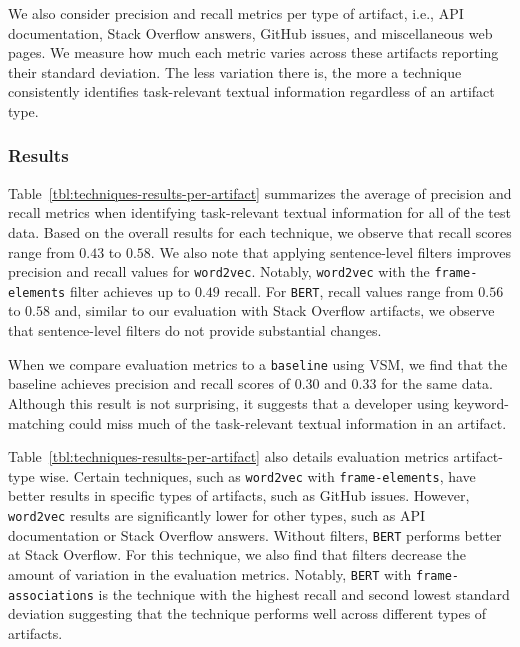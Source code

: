 We also consider precision and recall metrics per type of artifact, i.e., API documentation, Stack Overflow answers, GitHub issues, and miscellaneous web pages.
We measure how much each metric varies across these artifacts reporting their standard deviation.
The less variation there is, the more a technique consistently identifies task-relevant textual information regardless of an artifact type.


\subsubsection{Results}


Table~\ref{tbl:techniques-results-per-artifact} summarizes the average of precision and recall metrics when identifying task-relevant textual information for all of the test data.
Based on the overall results for each technique, we observe that recall scores range from $0.43$ to $0.58$. 
We also note that applying sentence-level filters improves precision and recall values for \texttt{word2vec}. Notably, \texttt{word2vec} with the \texttt{frame-elements} filter achieves up to $0.49$ recall.
For \texttt{BERT}, recall values range from $0.56$ to $0.58$ and, similar to our evaluation with Stack Overflow artifacts,  we observe that sentence-level filters do not provide substantial changes. 



When we compare evaluation metrics to a \texttt{baseline} using VSM, we find that the baseline achieves precision and recall scores of $0.30$ and $0.33$ for the same data. 
Although this result is not surprising, it suggests that a developer using keyword-matching could miss much of the task-relevant textual information in an artifact.


Table~\ref{tbl:techniques-results-per-artifact} also details
evaluation metrics artifact-type wise.
Certain techniques, such as \texttt{word2vec} with \texttt{frame-elements}, have better results in specific 
types of artifacts, such as GitHub issues. However, \texttt{word2vec} results are significantly lower 
for other types, such as API documentation or Stack Overflow answers. 
Without filters, \texttt{BERT} performs better at Stack Overflow. For this technique,
we also find that filters decrease 
the amount of variation in the evaluation metrics. Notably, 
\texttt{BERT} with \texttt{frame-associations} is the technique with the highest recall and 
second lowest standard deviation 
suggesting that the technique performs well across different types of artifacts.




